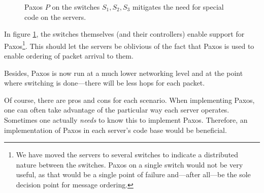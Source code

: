 \begin{figure}[H]
  \centering
  \caption{Paxos $P$ on the switches $S_1, S_2, S_3$ mitigates the need for special code on the servers.}
  \label{figure:paxos.on.switches}
\end{figure}

In figure \ref{figure:paxos.on.switches}, the switches themselves (and their
controllers) enable
support for Paxos\footnote{We have moved the servers to several switches
to indicate a distributed nature between the switches.
Paxos on a single switch would not be very useful, as that would be a single
point of failure and---after all---be the sole decision point for message
ordering.}.
This should let the servers be oblivious of the fact that Paxos is used to
enable ordering of packet arrival to them.

Besides, Paxos is now run at a much lower networking level and at the point
where switching is done---there will be less hops for each packet.

Of course, there are pros and cons for each scenario.
When implementing Paxos, one can often take advantage of
the particular way each server operates. Sometimes one actually
\textit{needs} to know this to implement Paxos.  Therefore, an
implementation of Paxos in each server's code base would be beneficial.

